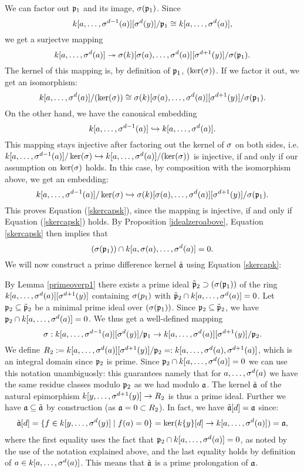 \begin{prop}
\begin{bew}
We can factor out $\mathfrak{p}_1$ and its image, $\sigma(\mathfrak{p}_1)$. Since $$k[a,\ldots,\sigma^{d-1}(a)][\sigma^d(y)] / \mathfrak{p}_1 \cong k[a,\ldots, \sigma^d(a)],$$
we get a surjectve mapping $$k[a,\ldots, \sigma^d(a)] \twoheadrightarrow \sigma(k)[\sigma(a),\ldots,\sigma^d(a)][\sigma^{d+1}(y)]/\sigma(\mathfrak{p}_1).$$
The kernel of this mapping is, by definition of $\mathfrak{p}_1$, $(\ker(\sigma))$. If we factor it out, we get an isomorphism:
\[ k[a,\ldots, \sigma^d(a)]/(\operatorname{ker}(\sigma)) \cong \sigma(k)[\sigma(a),\ldots,\sigma^d(a)][\sigma^{d+1}(y)]/\sigma(\mathfrak{p}_1). \]
On the other hand, we have the canonical embedding $$k[a,\ldots,\sigma^{d-1}(a)] \hookrightarrow k[a,\ldots,\sigma^{d}(a)].$$
This mapping stays injective after factoring out the kernel of $\sigma$ on both sides, 
i.e. $k[a,\ldots,\sigma^{d-1}(a)]/\operatorname{ker}(\sigma) \hookrightarrow k[a,\ldots,\sigma^{d}(a)]/(\operatorname{ker}(\sigma))$ is injective, if and only if our assumption on $\ker(\sigma)$ holds.
In this case, by composition with the isomorphism above, we get an embedding:
\[ k[a,\ldots,\sigma^{d-1}(a)]/\operatorname{ker}(\sigma) \hookrightarrow \sigma(k)[\sigma(a),\ldots,\sigma^d(a)][\sigma^{d+1}(y)]/\sigma(\mathfrak{p}_1). \]
This proves Equation (\ref{skercapsk}), since the mapping is injective, if and only if Equation (\ref{skercapsk}) holds.
By Proposition \ref{idealzeroabove}, Equation \ref{skercapsk} then implies that
\begin{equation}\label{skercapk}
(\sigma(\mathfrak{p}_1)) \cap k[a,\sigma(a),\ldots,\sigma^d(a)]
 = 0.
\end{equation}
We will now construct a prime difference kernel $\tilde {\mathfrak{a}}$ using Equation \ref{skercapk}:

By Lemma \ref{primeoverp1} there exists a prime ideal $\tilde {\mathfrak{p}}_2 \supset (\sigma(\mathfrak{p}_1))$ of the ring $k[a,\ldots,\sigma^d(a)][\sigma^{d+1}(y)]$ containing $\sigma(p_1)$ with $\tilde {\mathfrak{p}}_2 \cap k[a,\ldots,\sigma^d(a)] = 0$. 
Let $\mathfrak{p}_2 \subseteq \tilde {\mathfrak{p}}_2$ be a minimal prime ideal over $(\sigma(\mathfrak{p}_1))$. Since $\mathfrak{p}_2 \subseteq \tilde {\mathfrak{p}}_2$, we have $\mathfrak{p}_2 \cap k[a,\ldots,\sigma^d(a)] = 0$.
We thus get a well-defined mapping
\[ \sigma: k[a,\ldots,\sigma^{d-1}(a)][\sigma^d(y)]/\mathfrak{p}_1 \rightarrow k[a,\ldots, \sigma^d(a)][\sigma^{d+1}(y)]/\mathfrak{p}_2. \]
We define $R_2:= k[a,\ldots,\sigma^d(a)][\sigma^{d+1}(y)]/\mathfrak{p}_2 =: k[a,\ldots,\sigma^d(a),\sigma^{d+1}(a)]$, which is an integral domain since $\mathfrak{p}_2$ is prime. Since $\mathfrak{p}_2 \cap k[a,\ldots,\sigma^d(a)] = 0$ we can use this notation unambiguosly:
this guarantees namely that for $a, \ldots, \sigma^d(a)$ we have the same residue classes modulo $\mathfrak{p}_2$ as we had modulo $\mathfrak{a}$.
The kernel $\tilde {\mathfrak{a}}$ of the natural epimorphism $k[y,\ldots,\sigma^{d+1}(y)] \rightarrow R_2$ is thus a prime ideal.
Further we have $\mathfrak{a} \subseteq \tilde {\mathfrak{a}}$ by construction (as $\mathfrak{a} = 0 \subset R_2$). In fact, we have $\tilde {\mathfrak{a}}[d] = \mathfrak{a}$ since: 
\begin{align*}
\tilde {\mathfrak{a}}[d] = \{ f \in k[y,\ldots,\sigma^d(y)] \mid f(a) = 0 \} = \ker( k\{y\}[d] \rightarrow k[a,\ldots,\sigma^{d}(a)]) = \mathfrak{a},
\end{align*}
where the first equality uses the fact that $\mathfrak{p}_2 \cap k[a,\ldots,\sigma^d(a)] = 0$, as noted by the use of the notation explained above, and the last equality holds by definition of $a \in k[a,\ldots,\sigma^d(a)]$. This means that $\tilde {\mathfrak{a}}$ is a prime prolongation of $\mathfrak{a}$. 
\end{bew}
\end{prop}


